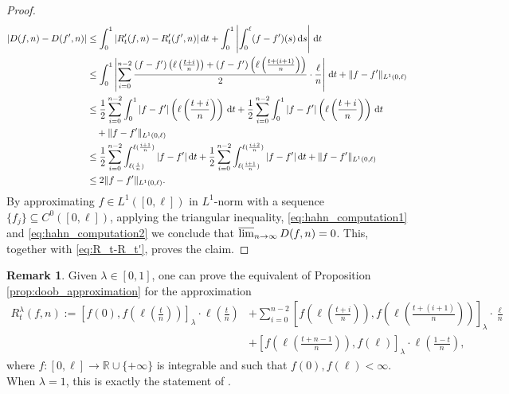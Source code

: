 \documentclass[12pt]{amsart}
\newcommand{\R}{\mathbb{R}}
\renewcommand{\d}{{\mathrm d}}
\newcommand{\lims}{\varlimsup}
\theoremstyle{definition}
\newtheorem{remark}[theorem]{Remark}
\begin{document}
\begin{proof}
\begin{equation}
\begin{aligned}
        |D(f,n)-D(f',n)| & \le
        \int_0^1 |R_t'(f,n)-R_t'(f',n)|\,\d t + \int_0^1 \left| \int_0^\ell (f-f')(s)\,\d s \right|\,\d t
        \\
        &\le 
        \int_0^1 \left| \sum_{i=0}^{n-2}\frac{(f-f')\left(\ell\left(\frac{t+i}{n}\right)\right)+(f-f')\left(\ell\left(\frac{t+(i+1)}{n}\right)\right)}{2}\cdot\frac{\ell}{n}\right|\,\d t+\|f-f'\|_{L^1(0,\ell)}\\
        & \le \frac{1}{2}\sum_{i=0}^{n-2}\int_0^1 |f-f'|\left( \ell\left(\frac{t+i}{n} \right)\right)\,\d t + \frac{1}{2}\sum_{i=0}^{n-2}\int_0^1 |f-f'|\left( \ell\left(\frac{t+i}{n} \right)\right)\,\d t   \\
        &\,\,\,\,\,\,+ \|f-f'\|_{L^1(0,\ell)}\\
        &\le \frac{1}{2}\sum_{i=0}^{n-2}\int_{\ell(\frac{i}{n})}^{\ell(\frac{i+1}{n})} |f-f'|\,\d t + \frac{1}{2}\sum_{i=0}^{n-2}\int_{\ell(\frac{i+1}{n})}^{\ell(\frac{i+2}{n})} |f-f'|\,\d t 
        + \|f-f'\|_{{\rm L}^1(0,\ell)}\\
        &\le 2 \|f-f'\|_{L^1(0,\ell)}.\\
    \end{aligned}
    \end{equation}
    By approximating $f \in L^1([0,\ell])$ in $L^1$-norm with a sequence $\{f_j\} \subseteq C^0([0,\ell])$, applying the triangular inequality, \eqref{eq:hahn_computation1} and \eqref{eq:hahn_computation2} we conclude that $\lims_{n \to \infty} D(f,n)=0$. This, together with \eqref{eq:R_t-R_t'}, proves the claim.
\end{proof}

\begin{remark}
\label{rmk:section_4_for_lambda}
    Given $\lambda \in [0,1]$, one can prove the equivalent of Proposition \ref{prop:doob_approximation} for the approximation
    \begin{equation}
       \begin{aligned}
           R_t^\lambda(f,n) := \left[f(0), f\left(\ell\left(\frac{t}{n}\right)\right)\right]_\lambda \cdot \ell\left(\frac{t}{n}\right) &+ \sum_{i=0}^{n-2}\left[f\left(\ell\left(\frac{t+i}{n}\right)\right),f\left(\ell\left(\frac{t+(i+1)}{n}\right)\right)\right]_\lambda\cdot\frac{\ell}{n} \\
           &+ \left[f\left(\ell \left(\frac{t+n-1}{n}\right)\right), f(\ell)\right]_\lambda \cdot \ell\left(\frac{1-t}{n}\right),
       \end{aligned}
   \end{equation}
   where $f\colon [0,\ell] \to \R \cup \{+\infty\}$ is integrable and such that $f(0),f(\ell) < \infty$. When $\lambda = 1$, this is exactly the statement of \cite[Pag.63]{Doob90}.
\end{remark}
\end{document}
